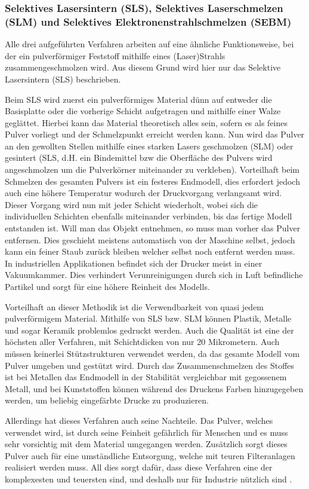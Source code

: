 \subsubsection{Selektives Lasersintern (SLS), Selektives Laserschmelzen (SLM) und Selektives Elektronenstrahlschmelzen (SEBM)}

Alle drei aufgeführten Verfahren arbeiten auf eine ähnliche Funktionsweise, bei der ein pulverförmiger Feststoff mithilfe eines (Laser)Strahls zusammengeschmolzen wird. Aus diesem Grund wird hier nur das Selektive Lasersintern (SLS) beschrieben.

Beim SLS wird zuerst ein pulverförmiges Material dünn auf entweder die Basisplatte oder die vorherige Schicht aufgetragen und mithilfe einer Walze geglättet. Hierbei kann das Material theoretisch alles sein, sofern es als feines Pulver vorliegt und der Schmelzpunkt erreicht werden kann. Nun wird das Pulver an den gewollten Stellen mithilfe eines starken Lasers geschmolzen (SLM) oder gesintert (SLS, d.H. ein Bindemittel bzw die Oberfläche des Pulvers wird angeschmolzen um die Pulverkörner miteinander zu verkleben). Vorteilhaft beim Schmelzen des gesamten Pulvers ist ein festeres Endmodell, dies erfordert jedoch auch eine höhere Temperatur wodurch der Druckvorgang verlangsamt wird. Dieser Vorgang wird nun mit jeder Schicht wiederholt, wobei sich die individuellen Schichten ebenfalls miteinander verbinden, bis das fertige Modell entstanden ist. Will man das Objekt entnehmen, so muss man vorher das Pulver entfernen. Dies geschieht meistens automatisch von der Maschine selbst, jedoch kann ein feiner Staub zurück bleiben welcher selbst noch entfernt werden muss. In industriellen Applikationen befindet sich der Drucker meist in einer Vakuumkammer. Dies verhindert Verunreinigungen durch sich in Luft befindliche Partikel und sorgt für eine höhere Reinheit des Modells.

Vorteilhaft an dieser Methodik ist die Verwendbarkeit von quasi jedem pulverförmigem Material. Mithilfe von SLS bzw. SLM können Plastik, Metalle und sogar Keramik problemlos gedruckt werden. Auch die Qualität ist eine der höchsten aller Verfahren, mit Schichtdicken von nur 20 Mikrometern. Auch müssen keinerlei Stützstrukturen verwendet werden, da das gesamte Modell vom Pulver umgeben und gestützt wird. Durch das Zusammenschmelzen des Stoffes ist bei Metallen das Endmodell in der Stabilität vergleichbar mit gegossenem Metall, und bei Kunststoffen können während des Druckens Farben hinzugegeben werden, um beliebig eingefärbte Drucke zu produzieren.

Allerdings hat dieses Verfahren auch seine Nachteile. Das Pulver, welches verwendet wird, ist durch seine Feinheit gefährlich für Menschen und es muss sehr vorsichtig mit dem Material umgegangen werden. Zusätzlich sorgt dieses Pulver auch für eine umständliche Entsorgung, welche mit teuren Filteranlagen realisiert werden muss. All dies sorgt dafür, dass diese Verfahren eine der komplexesten und teuersten sind, und deshalb nur für Industrie nützlich sind  \parencite[Informationen aus:][]{DRUCKVERFAHREN,SLSDetail}.